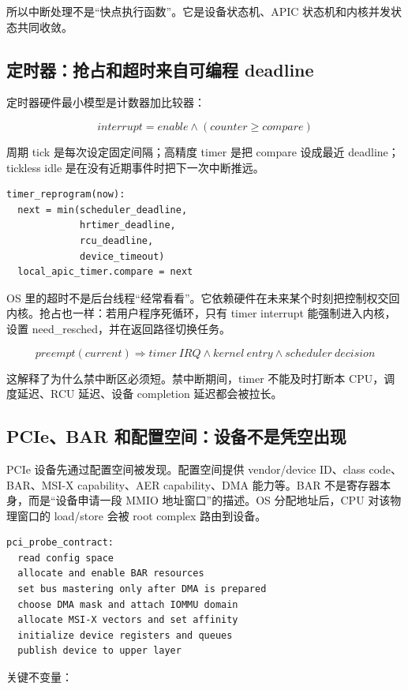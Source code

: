 所以中断处理不是“快点执行函数”。它是设备状态机、APIC 状态机和内核并发状态共同收敛。

\subsection{定时器：抢占和超时来自可编程 deadline}

定时器硬件最小模型是计数器加比较器：

\[
interrupt = enable \land (counter \ge compare)
\]

周期 tick 是每次设定固定间隔；高精度 timer 是把 compare 设成最近 deadline；tickless idle 是在没有近期事件时把下一次中断推远。

\begin{lstlisting}
timer_reprogram(now):
  next = min(scheduler_deadline,
             hrtimer_deadline,
             rcu_deadline,
             device_timeout)
  local_apic_timer.compare = next
\end{lstlisting}

OS 里的超时不是后台线程“经常看看”。它依赖硬件在未来某个时刻把控制权交回内核。抢占也一样：若用户程序死循环，只有 timer interrupt 能强制进入内核，设置 need\_resched，并在返回路径切换任务。

\[
preempt(current)\Rightarrow timer\ IRQ \land kernel\ entry \land scheduler\ decision
\]

这解释了为什么禁中断区必须短。禁中断期间，timer 不能及时打断本 CPU，调度延迟、RCU 延迟、设备 completion 延迟都会被拉长。

\subsection{PCIe、BAR 和配置空间：设备不是凭空出现}

PCIe 设备先通过配置空间被发现。配置空间提供 vendor/device ID、class code、BAR、MSI-X capability、AER capability、DMA 能力等。BAR 不是寄存器本身，而是“设备申请一段 MMIO 地址窗口”的描述。OS 分配地址后，CPU 对该物理窗口的 load/store 会被 root complex 路由到设备。

\begin{lstlisting}
pci_probe_contract:
  read config space
  allocate and enable BAR resources
  set bus mastering only after DMA is prepared
  choose DMA mask and attach IOMMU domain
  allocate MSI-X vectors and set affinity
  initialize device registers and queues
  publish device to upper layer
\end{lstlisting}

关键不变量：

